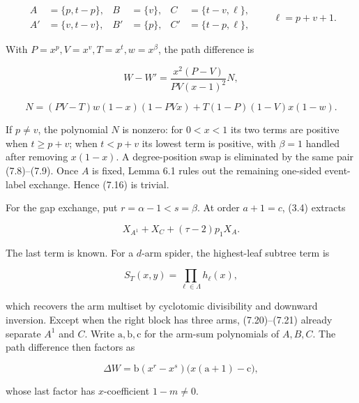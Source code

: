 \documentclass[11pt]{article}
\renewcommand{\mathsf}[1]{\mathrm{#1}}
\begin{document}
\begin{equation*}
\begin{aligned}
A&=\{p,t-p\},&B&=\{v\},&C&=\{t-v,\ell\},\\
A'&=\{v,t-v\},&B'&=\{p\},&C'&=\{t-p,\ell\},
\end{aligned}
\qquad \ell=p+v+1.
\tag{7.17}
\end{equation*}


With $P=x^p,V=x^v,T=x^t,w=x^\beta$, the path difference is

\begin{equation*}
W-W'=\frac{x^2(P-V)}{PV(x-1)^2}N,
\tag{7.18}
\end{equation*}


\begin{equation*}
N=(PV-T)w(1-x)(1-PVx)+T(1-P)(1-V)x(1-w).
\tag{7.19}
\end{equation*}


If $p\neq v$, the polynomial $N$ is nonzero: for $0<x<1$ its two terms are positive when
$t\geq p+v$; when $t<p+v$ its lowest term is positive, with $\beta=1$ handled after removing
$x(1-x)$. A degree-position swap is eliminated by the same pair (7.8)--(7.9). Once $A$ is fixed,
Lemma 6.1 rules out the remaining one-sided event-label exchange. Hence (7.16) is trivial.

For the gap exchange, put $r=\alpha-1<s=\beta$. At order $a+1=c$, (3.4) extracts

\begin{equation*}
X_{A^1}+X_C+(\tau-2)p_1X_A.
\tag{7.20}
\end{equation*}


The last term is known. For a $d$-arm spider, the highest-leaf subtree term is

\begin{equation*}
[y^d]S_T(x,y)=\prod_{\ell\in\Lambda}h_\ell(x),
\tag{7.21}
\end{equation*}


which recovers the arm multiset by cyclotomic divisibility and downward inversion. Except when the
right block has three arms, (7.20)--(7.21) already separate $A^1$ and $C$. Write
$\mathsf a,\mathsf b,\mathsf c$ for the arm-sum polynomials of $A,B,C$. The path difference then
factors as

\begin{equation*}
\Delta W=\mathsf b(x^r-x^s)\bigl(x(\mathsf a+1)-\mathsf c\bigr),
\tag{7.22}
\end{equation*}


whose last factor has $x$-coefficient $1-m\neq0$.
\end{document}

